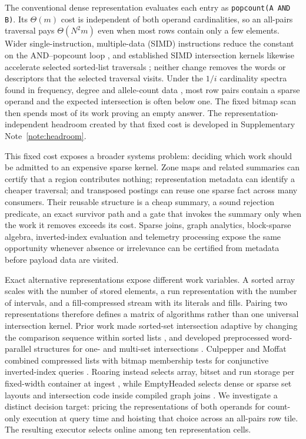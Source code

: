 The conventional dense representation evaluates each entry as
\texttt{popcount(A AND B)}. Its $\Theta(m)$ cost is independent of both operand cardinalities, so an
all-pairs traversal pays $\Theta(N^2m)$ even when most rows contain only a few elements. Wider
single-instruction, multiple-data (SIMD)
instructions reduce the constant on the AND--popcount loop \cite{mula2018popcount}, and established
SIMD intersection kernels likewise accelerate selected sorted-list traversals
\cite{inoue2014simdintersection,lemire2016simdintersection}; neither change removes the words or
descriptors that the selected traversal visits. Under the $1/i$ cardinality spectra found in frequency, degree
and allele-count data \cite{fu1995}, most row pairs contain a sparse operand and the expected
intersection is often below one. The fixed bitmap scan then spends most of its work proving an empty
answer. The representation-independent headroom created by that fixed cost is developed in
Supplementary Note~\ref{note:headroom}.

This fixed cost exposes a broader systems problem: deciding which work should be admitted to an
expensive sparse kernel. Zone maps and related summaries can certify that a region contributes
nothing; representation metadata can identify a cheaper traversal; and transposed postings can reuse
one sparse fact across many consumers. Their reusable structure is a cheap summary, a sound rejection
predicate, an exact survivor path and a gate that invokes the summary only when the work it removes
exceeds its cost. Sparse joins, graph analytics, block-sparse algebra, inverted-index evaluation and
telemetry processing expose the same opportunity whenever absence or irrelevance can be certified
from metadata before payload data are visited.

Exact alternative representations expose different work variables. A sorted array scales with the
number of stored elements, a run representation with the number of intervals, and a fill-compressed
stream with its literals and fills. Pairing two representations therefore defines a matrix of
algorithms rather than one universal intersection kernel. Prior work made sorted-set intersection
adaptive by changing the comparison sequence within sorted lists
\cite{demaine2000adaptive}, and developed preprocessed word-parallel structures for one- and
multi-set intersections \cite{ding2011intersection}. Culpepper and Moffat combined compressed lists
with bitmap membership tests for conjunctive inverted-index queries
\cite{culpepper2010intersection}. Roaring instead selects array, bitset and run storage per
fixed-width container at ingest \cite{chambi2016roaring,lemire2018roaring}, while EmptyHeaded selects
dense or sparse set layouts and intersection code inside compiled graph joins
\cite{aberger2016emptyheaded,aberger2017emptyheaded}. We investigate a distinct decision target:
pricing the representations of both operands for count-only execution at query time and hoisting
that choice across an all-pairs row tile. The resulting executor selects online among ten
representation cells.

